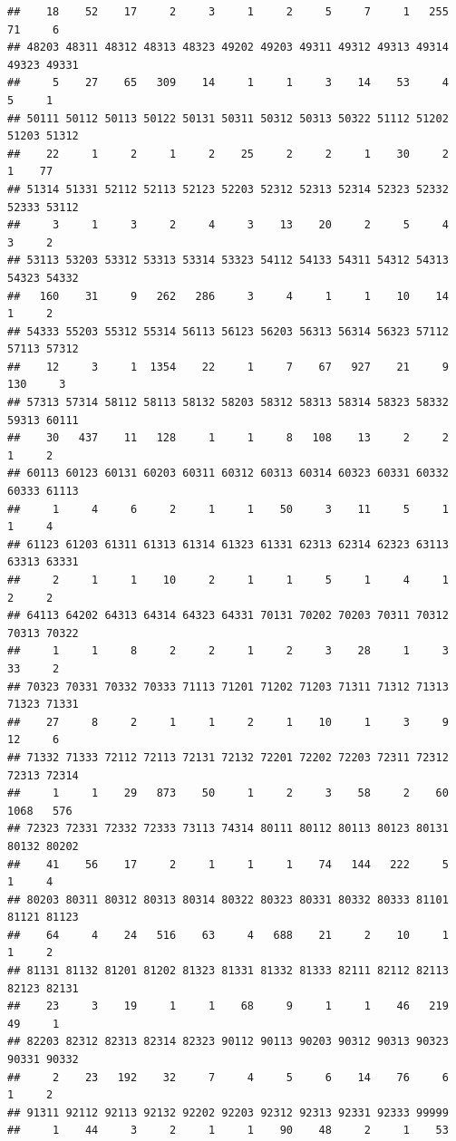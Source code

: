 \documentclass[
]{book}
\begin{document}
\begin{verbatim}
##    18    52    17     2     3     1     2     5     7     1   255    71     6 
## 48203 48311 48312 48313 48323 49202 49203 49311 49312 49313 49314 49323 49331 
##     5    27    65   309    14     1     1     3    14    53     4     5     1 
## 50111 50112 50113 50122 50131 50311 50312 50313 50322 51112 51202 51203 51312 
##    22     1     2     1     2    25     2     2     1    30     2     1    77 
## 51314 51331 52112 52113 52123 52203 52312 52313 52314 52323 52332 52333 53112 
##     3     1     3     2     4     3    13    20     2     5     4     3     2 
## 53113 53203 53312 53313 53314 53323 54112 54133 54311 54312 54313 54323 54332 
##   160    31     9   262   286     3     4     1     1    10    14     1     2 
## 54333 55203 55312 55314 56113 56123 56203 56313 56314 56323 57112 57113 57312 
##    12     3     1  1354    22     1     7    67   927    21     9   130     3 
## 57313 57314 58112 58113 58132 58203 58312 58313 58314 58323 58332 59313 60111 
##    30   437    11   128     1     1     8   108    13     2     2     1     2 
## 60113 60123 60131 60203 60311 60312 60313 60314 60323 60331 60332 60333 61113 
##     1     4     6     2     1     1    50     3    11     5     1     1     4 
## 61123 61203 61311 61313 61314 61323 61331 62313 62314 62323 63113 63313 63331 
##     2     1     1    10     2     1     1     5     1     4     1     2     2 
## 64113 64202 64313 64314 64323 64331 70131 70202 70203 70311 70312 70313 70322 
##     1     1     8     2     2     1     2     3    28     1     3    33     2 
## 70323 70331 70332 70333 71113 71201 71202 71203 71311 71312 71313 71323 71331 
##    27     8     2     1     1     2     1    10     1     3     9    12     6 
## 71332 71333 72112 72113 72131 72132 72201 72202 72203 72311 72312 72313 72314 
##     1     1    29   873    50     1     2     3    58     2    60  1068   576 
## 72323 72331 72332 72333 73113 74314 80111 80112 80113 80123 80131 80132 80202 
##    41    56    17     2     1     1     1    74   144   222     5     1     4 
## 80203 80311 80312 80313 80314 80322 80323 80331 80332 80333 81101 81121 81123 
##    64     4    24   516    63     4   688    21     2    10     1     1     2 
## 81131 81132 81201 81202 81323 81331 81332 81333 82111 82112 82113 82123 82131 
##    23     3    19     1     1    68     9     1     1    46   219    49     1 
## 82203 82312 82313 82314 82323 90112 90113 90203 90312 90313 90323 90331 90332 
##     2    23   192    32     7     4     5     6    14    76     6     1     2 
## 91311 92112 92113 92132 92202 92203 92312 92313 92331 92333 99999 
##     1    44     3     2     1     1    90    48     2     1    53
\end{verbatim}
\end{document}
